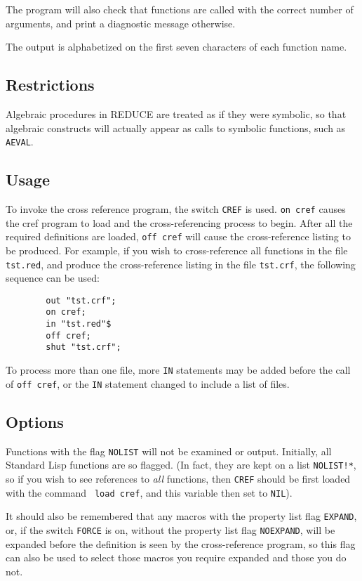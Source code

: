 \documentclass[11pt,letterpaper]{book}
\makeatletter
\newcommand{\REDUCE}{REDUCE}
\newcommand{\underscore}{\_}
\newcommand{\ttindex}[1]{{\renewcommand{\_}{\protect\underscore}%
                          \index{#1@{\tt #1}}}}
\makeatother
\begin{document}
The program will also check that functions are called with the correct
number of arguments, and print a diagnostic message otherwise.

The output is alphabetized on the first seven characters of each function
name.

\subsection{Restrictions}

Algebraic procedures in {\REDUCE} are treated as if they were symbolic, so
that algebraic constructs will actually appear as calls to symbolic
functions, such as {\tt AEVAL}.

\subsection{Usage}

To invoke the cross reference program, the switch {\tt CREF}
\ttindex{CREF} is used. {\tt on cref} causes the cref program to load
and the cross-referencing process to begin.  After all the required
definitions are loaded, {\tt off cref} will cause the cross-reference
listing to be produced.  For example, if you wish to cross-reference all
functions in the file {\tt tst.red}, and produce the cross-reference
listing in the file {\tt tst.crf}, the following sequence can be used:
{\small\begin{verbatim}
        out "tst.crf";
        on cref;
        in "tst.red"$
        off cref;
        shut "tst.crf";
\end{verbatim}}
To process more than one file, more {\tt IN} statements may be added
before the call of {\tt off cref}, or the {\tt IN} statement changed to
include a list of files.

\subsection{Options}

Functions with the flag {\tt NOLIST} will not be examined or output.
Initially, all Standard Lisp functions are so flagged. (In fact, they are
kept on a list {\tt NOLIST!*}, so if you wish to see references to {\em
all} functions, then {\tt CREF} should be first loaded with the command {\tt
load cref}, and this variable then set to {\tt NIL}).

It should also be remembered that any macros with the property list flag
{\tt EXPAND}, or, if the switch {\tt FORCE} is on, without the property
list flag {\tt NOEXPAND}, will be expanded before the definition is seen
by the cross-reference program, so this flag can also be used to select
those macros you require expanded and those you do not.
\end{document}
